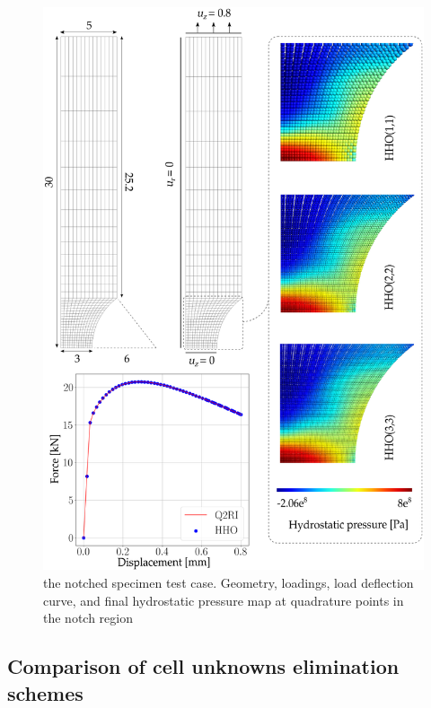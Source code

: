 \begin{figure}[H]
    \centering
    \includegraphics[width=12.cm]{../chapter_002_hho_mechanics/figures/ssna_mesh.png}
    \caption{
        the notched specimen test case. Geometry, loadings, load deflection curve, and final hydrostatic pressure map at quadrature points in the notch region
    }
    \label{fig_ssnaallmesh}
\end{figure}

\subsection{Comparison of cell unknowns elimination schemes}
\label{sec_num_example_part_2}

